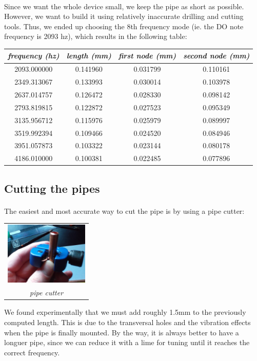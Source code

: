 \documentclass[12pt]{article}
\begin{document}
\paragraph{} Since we want the whole device small, we keep the pipe as short
as possible. However, we want to build it using relatively inaccurate
drilling and cutting tools. Thus, we ended up choosing the 8th frequency mode
(ie. the DO note frequency is 2093 hz), which results in the following table:
\begin{center}
  \begin{tabular}{|c|c|c|c|}
    \hline
    \textit{frequency (hz)} &
    \textit{length (mm)} &
    \textit{first node (mm)} &
    \textit{second node (mm)} \\
    \hline
    2093.000000 & 0.141960 & 0.031799 & 0.110161 \\
    \hline
    2349.313067 & 0.133993 & 0.030014 & 0.103978 \\
    \hline
    2637.014757 & 0.126472 & 0.028330 & 0.098142 \\
    \hline
    2793.819815 & 0.122872 & 0.027523 & 0.095349 \\
    \hline
    3135.956712 & 0.115976 & 0.025979 & 0.089997 \\
    \hline
    3519.992394 & 0.109466 & 0.024520 & 0.084946 \\
    \hline
    3951.057873 & 0.103322 & 0.023144 & 0.080178 \\
    \hline
    4186.010000 & 0.100381 & 0.022485 & 0.077896 \\
    \hline
\end{tabular}
\end{center}

\subsection{Cutting the pipes}
\paragraph{} The easiest and most accurate way to cut the pipe is by using a pipe cutter:
\begin{center}
  \begin{tabular}{c}
    \includegraphics[keepaspectratio=true, width=40mm]{../pics/tools/pipe_cutter_scaled.jpg}
    \\
    \smallskip
    \tiny{\textit{pipe cutter}}
  \end{tabular}
\end{center}
We found experimentally that we must add roughly 1.5mm to the previously computed length.
This is due to the transversal holes and the vibration effects when the pipe is finally
mounted. By the way, it is always better to have a longuer pipe, since we can reduce it
with a lime for tuning until it reaches the correct frequency.
\end{document}
